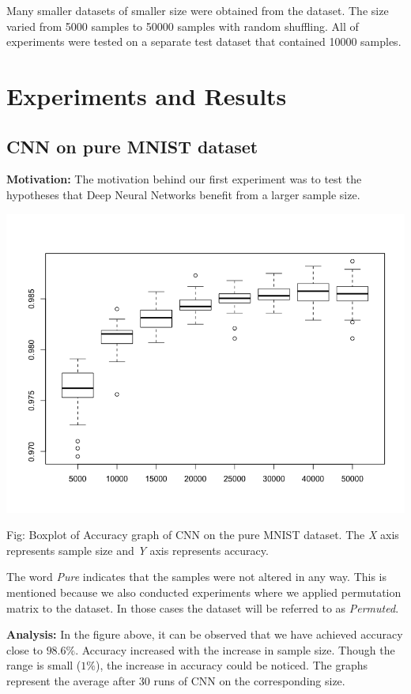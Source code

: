 \documentclass{article}
\begin{document}
Many smaller datasets of smaller size were obtained from the dataset. The size varied from 5000 samples to 50000 samples with random shuffling. All of experiments were tested on a separate test dataset that contained 10000 samples.

\section*{Experiments and Results}
\subsection*{CNN on pure MNIST dataset}
\textbf{Motivation:} The motivation behind our first experiment was to test the hypotheses that Deep Neural Networks benefit from a larger sample size. 
\begin{center}
	\includegraphics[scale=0.35]{new_cnn_mnist_pure}
\end{center}
\begin{center}
	Fig: Boxplot of Accuracy graph of CNN on the pure MNIST dataset. The \textit{X} axis represents sample size and \textit{Y} axis represents accuracy.
\end{center}

The word \textit{Pure} indicates that the samples were not altered in any way. This is mentioned because we also conducted experiments where we applied permutation matrix to the dataset. In those cases the dataset will be referred to as \textit{Permuted}.

\textbf{Analysis:} In the figure above, it can be observed that we have achieved accuracy close to $98.6\%$. Accuracy increased with the increase in sample size. Though the range is small ($1\%$), the increase in accuracy could be noticed. The graphs represent the average after 30 runs of CNN on the corresponding size.
\end{document}

